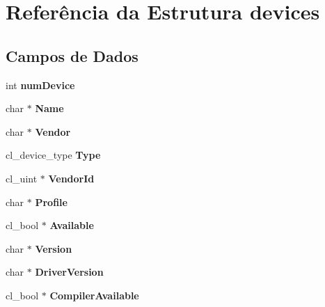 \hypertarget{structdevices}{}\section{Referência da Estrutura devices}
\label{structdevices}
\subsection*{Campos de Dados}
\begin{DoxyCompactItemize}
\item 
\hypertarget{structdevices_a6856fb3bba012c7b3abcfbe847ea4d27}{}\label{structdevices_a6856fb3bba012c7b3abcfbe847ea4d27} 
int {\bfseries num\+Device}
\item 
\hypertarget{structdevices_a5e6182c030324511dd82e9fa1a0ab071}{}\label{structdevices_a5e6182c030324511dd82e9fa1a0ab071} 
char $\ast$ {\bfseries Name}
\item 
\hypertarget{structdevices_a3edc9ba9f59b30aa97a8d6d258caa80f}{}\label{structdevices_a3edc9ba9f59b30aa97a8d6d258caa80f} 
char $\ast$ {\bfseries Vendor}
\item 
\hypertarget{structdevices_af66389a0175743dbb20408cc354de4f1}{}\label{structdevices_af66389a0175743dbb20408cc354de4f1} 
cl\+\_\+device\+\_\+type {\bfseries Type}
\item 
\hypertarget{structdevices_a1daa59b7c3a24931a3d38b8f2e30d2cd}{}\label{structdevices_a1daa59b7c3a24931a3d38b8f2e30d2cd} 
cl\+\_\+uint $\ast$ {\bfseries Vendor\+Id}
\item 
\hypertarget{structdevices_aa03bc49fe9aa53252d807b5b29c2fa5b}{}\label{structdevices_aa03bc49fe9aa53252d807b5b29c2fa5b} 
char $\ast$ {\bfseries Profile}
\item 
\hypertarget{structdevices_a69f3ac687998d8e0325d11b5ffdb83b3}{}\label{structdevices_a69f3ac687998d8e0325d11b5ffdb83b3} 
cl\+\_\+bool $\ast$ {\bfseries Available}
\item 
\hypertarget{structdevices_abc057f42fdaf5e63835a8272aefe278e}{}\label{structdevices_abc057f42fdaf5e63835a8272aefe278e} 
char $\ast$ {\bfseries Version}
\item 
\hypertarget{structdevices_a80db1b5836fa2f329777658847144c3a}{}\label{structdevices_a80db1b5836fa2f329777658847144c3a} 
char $\ast$ {\bfseries Driver\+Version}
\item 
\hypertarget{structdevices_accb48def3c87e3dcde3061ea53ca156f}{}\label{structdevices_accb48def3c87e3dcde3061ea53ca156f} 
cl\+\_\+bool $\ast$ {\bfseries Compiler\+Available}
\item 

\end{DoxyCompactItemize}
